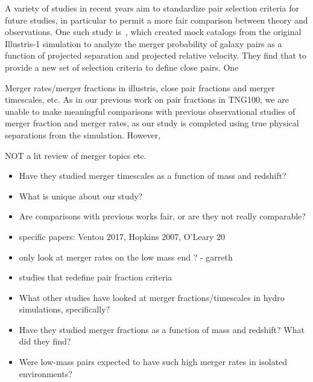 \documentclass[twocolumn,linenumbers]{aastex631}
\begin{document}
    A variety of studies in recent years aim to standardize pair selection criteria for future studies, in particular to permit a more fair comparison between theory and observations. 
    One such study is~\citet{Ventou2017}, which created mock catalogs from the original Illustris-1 simulation to analyze the merger probability of galaxy pairs as a function of projected separation and projected relative velocity. 
    They find that 
    to provide a new set of selection criteria to define close pairs. 
    One

    Merger rates/merger fractions in illustris, close pair fractions and merger timescales, etc. 
    As in our previous work on pair fractions in TNG100, we are unable to make meaningful comparisons with previous observational studies of merger fraction and merger rates, as our study is completed using true physical separations from the simulation. 
    However, 
    
    

    
    
    NOT a lit review of merger topics etc. 
        \begin{itemize}
            \item Have they studied merger timescales as a function of mass and redshift? 
            \item What is unique about our study?
            \item Are comparisons with previous works fair, or are they not really comparable?
            \item specific papers: Ventou 2017, Hopkins 2007, O'Leary 20
            \item only look at merger rates on the low mass end ? - garreth 
            \item studies that redefine pair fraction criteria 
            \item What other studies have looked at merger fractions/timescales in hydro simulations, specifically? 
            \item Have they studied merger fractions as a function of mass and redshift? What did they find?
            \item Were low-mass pairs expected to have such high merger rates in isolated environments? 
        \end{itemize}
    
\end{document}

